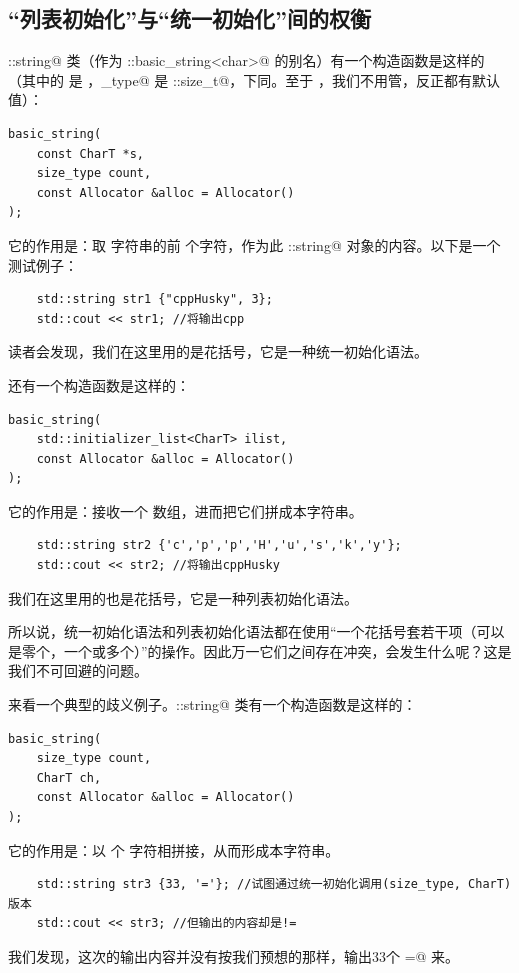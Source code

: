 \subsection*{``列表初始化''与``统一初始化''间的权衡}
\lstinline@std::string@ 类（作为 \lstinline@std::basic_string<char>@ 的别名）有一个构造函数是这样的（其中的 \lstinline@CharT@ 是 \lstinline@char@，\lstinline@size_type@ 是 \lstinline@std::size_t@，下同。至于 \lstinline@alloc@，我们不用管，反正都有默认值）：
\begin{lstlisting}
basic_string(
    const CharT *s,
    size_type count,
    const Allocator &alloc = Allocator()
);
\end{lstlisting}
它的作用是：取 \lstinline@s@ 字符串的前 \lstinline@count@ 个字符，作为此 \lstinline@std::string@ 对象的内容。以下是一个测试例子：
\begin{lstlisting}
    std::string str1 {"cppHusky", 3};
    std::cout << str1; //将输出cpp
\end{lstlisting}
读者会发现，我们在这里用的是花括号，它是一种统一初始化语法。\par
还有一个构造函数是这样的：
\begin{lstlisting}
basic_string(
    std::initializer_list<CharT> ilist,
    const Allocator &alloc = Allocator()
);
\end{lstlisting}
它的作用是：接收一个 \lstinline@char@ 数组，进而把它们拼成本字符串。
\begin{lstlisting}
    std::string str2 {'c','p','p','H','u','s','k','y'};
    std::cout << str2; //将输出cppHusky
\end{lstlisting}
我们在这里用的也是花括号，它是一种列表初始化语法。\par
所以说，统一初始化语法和列表初始化语法都在使用``一个花括号套若干项（可以是零个，一个或多个）''的操作。因此万一它们之间存在冲突，会发生什么呢？这是我们不可回避的问题。\par
来看一个典型的歧义例子。\lstinline@std::string@ 类有一个构造函数是这样的：
\begin{lstlisting}
basic_string(
    size_type count,
    CharT ch,
    const Allocator &alloc = Allocator()
);
\end{lstlisting}
它的作用是：以 \lstinline@count@ 个 \lstinline@ch@ 字符相拼接，从而形成本字符串。
\begin{lstlisting}
    std::string str3 {33, '='}; //试图通过统一初始化调用(size_type, CharT)版本
    std::cout << str3; //但输出的内容却是!=
\end{lstlisting}
我们发现，这次的输出内容并没有按我们预想的那样，输出33个 \lstinline@=@ 来。\par
